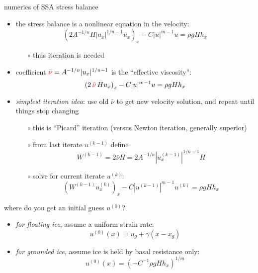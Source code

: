 \begin{frame}{numerics of SSA stress balance}

\begin{itemize}
\item the stress balance is a nonlinear equation in the velocity:
  $$\left(2 A^{-1/n} H |u_x|^{1/n - 1} u_x\right)_x - C|u|^{m-1}u = \rho g H h_x$$

\vspace{-2mm}
    \begin{itemize}
    \item[$\circ$] thus \alert{iteration is needed}    
    \end{itemize}
\item coefficient ${\color{red} \bar \nu} = A^{-1/n} |u_x|^{1/n-1}$ is the ``effective viscosity'':
   $$\left(2 \,{\color{red} \bar \nu}\, H u_x\right)_x - C |u|^{m-1} u = \rho g H h_x$$
\item \emph{simplest iteration idea}: use old $\bar\nu$ to get new velocity solution, and repeat until things stop changing
  \begin{itemize}
  \item[$\circ$] this is ``Picard'' iteration  (versus Newton iteration, generally superior)
  \item[$\circ$] from last iterate $u^{(k-1)}$ define
     $$W^{(k-1)} = 2 \bar \nu H = 2 A^{-1/n} |u^{(k-1)}_x|^{1/n-1} H$$
  \item[$\circ$] solve for current iterate $u^{(k)}$:
     $$\left(W^{(k-1)} u^{(k)}_x\right)_x - C |u^{(k-1)}|^{m-1} u^{(k)} = \rho g H h_x$$
  \end{itemize}
\end{itemize}
\end{frame}


\begin{frame}{where do you get an initial guess $u^{(0)}$?}

\begin{itemize}
\item \emph{for floating ice}, assume a uniform strain rate:
   $$u^{(0)}(x) = u_g + \gamma (x-x_g)$$
\item \emph{for grounded ice}, assume ice is held by basal resistance only:
   $$u^{(0)}(x) = \left(-C^{-1} \rho g H h_x\right)^{1/m}$$
\end{itemize}
\end{frame}


